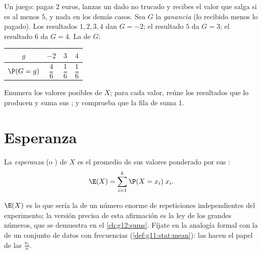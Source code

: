 \begin{example}\label{ex:g11:prob:game}
Un juego: pagas $2$ euros, lanzas un dado no trucado y recibes el valor
que salga si es al menos $5$, y nada en los demás casos. Sea $G$ la
\emph{ganancia} (lo recibido menos lo pagado). Los resultados $1, 2, 3, 4$
dan $G = -2$; el resultado $5$ da $G = 3$; el resultado $6$ da $G = 4$. La
 de $G$:
\begin{center}
\begin{tabular}{c|ccc}
$g$ & $-2$ & $3$ & $4$\\
\hline\rule{0pt}{11pt}%
$\P(G = g)$ & $\dfrac46$ & $\dfrac16$ & $\dfrac16$
\end{tabular}
\end{center}
\end{example}

\begin{method}\label{met:g11:prob:table}
Enumera los valores posibles de $X$; para cada valor, reúne los resultados
que lo producen y suma sus ; y comprueba que la fila de
 suma $1$.
\end{method}

\section{Esperanza}

\begin{definition}[Esperanza]\label{def:g11:prob:expectation}
La \emph{esperanza} (o ) de $X$ es el promedio de
sus valores ponderado por sus :
\[
\E(X) = \sum_{i=1}^{k} \P(X = x_i)\; x_i .
\]
\end{definition}

\begin{remark}
$\E(X)$ es lo que sería la  de un número enorme de repeticiones
independientes del experimento; la versión precisa de esta afirmación es
la ley de los grandes números, que se demuestra en el \cref{ch:g12:sums}.
Fíjate en la analogía formal con la  de un conjunto de datos con
frecuencias (\cref{def:g11:stat:mean}): las  hacen el papel
de las  $\frac{n_i}{n}$.
\end{remark}

